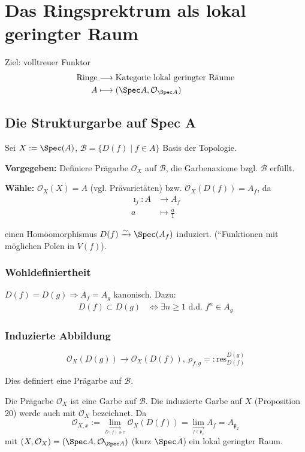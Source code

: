 \chapter*{Das Ringsprektrum als lokal geringter Raum}

Ziel: volltreuer Funktor
\begin{align*}
  \text{Ringe} & \longrightarrow\text{Kategorie lokal geringter Räume}\\
  A & \longmapsto(\Spec A,\mathcal{O}_{\Spec A})
\end{align*}


\section{Die Strukturgarbe auf Spec A}

Sei $X:=\Spec(A)$, $\mathcal{B}=\{D(f)\mid f\in A\}$ Basis der Topologie.

\textbf{Vorgegeben:} Definiere Prägarbe $\mathcal{O}_{X}$ auf $\mathcal{B}$,
die Garbenaxiome bzgl. $\mathcal{B}$ erfüllt.

\textbf{Wähle:} $\mathcal{O}_{X}(X)=A$ (vgl. Prävarietäten) bzw.
$\mathcal{O}_{X}(D(f))=A_{f}$, da
\begin{align*}
  \imath_{j}:A & \longrightarrow A_{f}\\
  a & \longmapsto\frac{a}{1}
\end{align*}

einen Homöomorphismus $D(f)\xrightarrow{\sim}\Spec(A_{f})$ induziert.
(``Funktionen mit möglichen Polen in $V(f)$).

\subsection{Wohldefiniertheit}

$D(f)=D(g)\Rightarrow A_{f}=A_{g}$ kanonisch. Dazu: 
\begin{align*}
  D(f)\subset D(g) & \Leftrightarrow\exists n\geq1\text{ d.d. }f^{n}\in A_{g}
\end{align*}


\subsection{Induzierte Abbildung}

\[
\mathcal{O}_{X}(D(g))\rightarrow\mathcal{O}_{X}(D(f)),\ \rho_{f,g}=:\text{res}_{D(f)}^{D(g)}
\]

Dies definiert eine Prägarbe auf $\mathcal{B}$.
\begin{thm}[orig. 33]
  Die Prägarbe $\mathcal{O}_{X}$ ist eine Garbe auf $\mathcal{B}$.
  Die induzierte Garbe auf $X$ (Proposition 20) werde auch mit $\mathcal{O}_{X}$
  bezeichnet. Da
  \[
  \mathcal{O}_{X,x}:=\underset{\underset{D(f)\ni x}{\longrightarrow}}{\lim}\mathcal{O}_{X}(D(f))=\underset{\underset{f\in\mathfrak{p}_{x}}{\longrightarrow}}{\lim}A_{f}=A_{\mathfrak{p}_{x}}
  \]
  mit $(X,\mathcal{O}_{X})=(\Spec A,\mathcal{O}_{\Spec A})$ (kurz $\Spec A$)
  ein lokal geringter Raum.
\end{thm}

